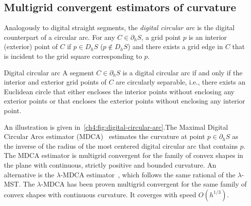 \subsection{Multigrid convergent estimators of curvature}

Analogously to digital straight segments, the \emph{digital circular arc} is the digital counterpart of a circular arc. For any $C \in \partial_h S$, a grid point $p$ is an interior (exterior) point of $C$ if $p \in D_h S$ ($p \notin D_h S$) and there exists a grid edge in $C$ that is incident to the grid square corresponding to $p$.

\begin{definition}{Digital circular arc} 
A segment $C \in \partial_h S$ is a digital circular arc if and only if the interior and exterior grid points of $C$ are circularly separable, i.e., there exists an Euclidean circle that either encloses the interior points without enclosing any exterior points or that encloses the exterior points without enclosing any interior point.
\end{definition}

An illustration is given in~\cref{ch4:fig:digital-circular-arc}.The Maximal Digital Circular Arcs estimator (MDCA)~\cite{roussillon11mdca} estimates the curvature at point $p \in \partial_h S$ as the inverse of the radius of the most centered digital circular arc that contains $p$. The MDCA estimator is multigrid convergent for the family of convex shapes in the plane with continuous, strictly positive and bounded curvature. An alternative is the $\lambda$-MDCA estimator~\cite{schindele17mdca}, which follows the same rational of the $\lambda$-MST. The $\lambda$-MDCA has been proven multigrid convergent for the same family of convex shapes with continuous curvature. It coverges with speed $O(h^{1/3})$.


